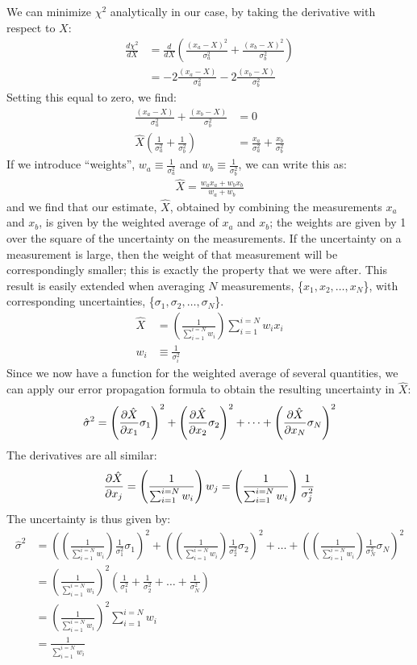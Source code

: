 We can minimize $\chi^2$ analytically in our case, by taking the derivative with respect to $X$:
\begin{align}
\frac{d\chi^2}{dX}&=\frac{d}{dX}\left(\frac{(x_a-X)^2}{\sigma_a^2}+\frac{(x_b-X)^2}{\sigma_b^2}\right)\nonumber\\
&=-2\frac{(x_a-X)}{\sigma_a^2}-2\frac{(x_b-X)}{\sigma_b^2}
\end{align} 
Setting this equal to zero, we find:
\begin{align}
\frac{(x_a-X)}{\sigma_a^2}+\frac{(x_b-X)}{\sigma_b^2}&=0\nonumber\\
\hat X\left(\frac{1}{\sigma_a^2}+\frac{1}{\sigma_b^2}\right)&=\frac{x_a}{\sigma_a^2}+\frac{x_b}{\sigma_b^2}
\end{align}
If we introduce ``weights'', $w_a\equiv\frac{1}{\sigma_a^2}$ and $w_b\equiv\frac{1}{\sigma_b^2}$, we can write this as:
\begin{align}
\hat X=\frac{w_ax_a+w_bx_b}{w_a+w_b}
\end{align}
and we find that our estimate, $\hat X$, obtained by combining the measurements $x_a$ and $x_b$, is given by the weighted average of $x_a$ and $x_b$; the weights are given by 1 over the square of the uncertainty on the measurements. If the uncertainty on a measurement is large, then the weight of that measurement will be correspondingly smaller; this is exactly the property that we were after. This result is easily extended when averaging $N$ measurements, \{$x_1, x_2, \dots, x_N$\}, with corresponding uncertainties, \{$\sigma_1, \sigma_2, \dots, \sigma_N  $\}.
\begin{align}
\hat X &= \left(\frac{1}{\sum_{i=1}^{i=N} w_i}\right)\sum_{i=1}^{i=N} w_i x_i\nonumber\\
w_i &\equiv \frac{1}{\sigma_i^2}
\end{align}
Since we now have a function for the weighted average of several quantities, we can apply our error propagation formula to obtain the resulting uncertainty in $\hat X$:
\begin{align}
\hat \sigma^2=\left(\frac{\partial \hat X}{\partial x_1}\sigma_1\right)^2+\left(\frac{\partial \hat X}{\partial x_2}\sigma_2\right)^2+\dots+\left(\frac{\partial \hat X}{\partial x_N}\sigma_N\right)^2
\end{align}
The derivatives are all similar:
\begin{align}
\frac{\partial \hat X}{\partial x_j}=\left(\frac{1}{\sum_{i=1}^{i=N} w_i}\right) w_j=\left(\frac{1}{\sum_{i=1}^{i=N} w_i}\right)\frac{1}{\sigma_j^2}
\end{align}
The uncertainty is thus given by:
\begin{align}
\hat \sigma^2&=\left(\left(\frac{1}{\sum_{i=1}^{i=N} w_i}\right)\frac{1}{\sigma_1^2}\sigma_1\right)^2+\left(\left(\frac{1}{\sum_{i=1}^{i=N} w_i}\right)\frac{1}{\sigma_2^2}\sigma_2\right)^2+\dots+\left(\left(\frac{1}{\sum_{i=1}^{i=N} w_i}\right)\frac{1}{\sigma_N^2}\sigma_N\right)^2\nonumber\\
&=\left(\frac{1}{\sum_{i=1}^{i=N} w_i}\right)^2 \left( \frac{1}{\sigma_1^2}+\frac{1}{\sigma_2^2}+\dots+\frac{1}{\sigma_N^2}  \right)\nonumber\\
&=\left(\frac{1}{\sum_{i=1}^{i=N} w_i}\right)^2\sum_{i=1}^{i=N}w_i\nonumber\\
&=\frac{1}{\sum_{i=1}^{i=N}w_i}
\end{align}
